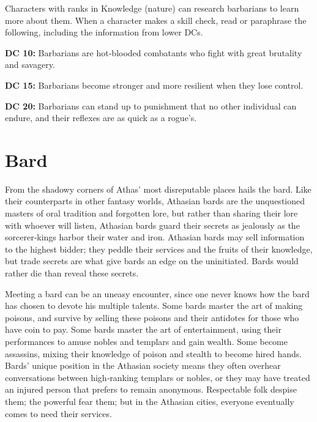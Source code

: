 \documentclass[10pt,a4paper,twocolumn]{d20}
\begin{document}
{Characters with ranks in Knowledge (nature) can research barbarians to learn more about them. When a character makes a skill check, read or paraphrase the following, including the information from lower DCs.

\textbf{DC 10:} Barbarians are hot‐blooded combatants who fight with great brutality and savagery.

\textbf{DC 15:} Barbarians become stronger and more resilient when they lose control.

\textbf{DC 20:} Barbarians can stand up to punishment that no other individual can endure, and their reflexes are as quick as a rogue’s.

\section{Bard}

From the shadowy corners of Athas’ most disreputable places hails the bard. Like their counterparts in other fantasy worlds, Athasian bards are the unquestioned masters of oral tradition and forgotten lore, but rather than sharing their lore with whoever will listen, Athasian bards guard their secrets as jealously as the sorcerer‐kings harbor their water and iron. Athasian bards may sell information to the highest bidder; they peddle their services and the fruits of their knowledge, but trade secrets are what give bards an edge on the uninitiated. Bards would rather die than reveal these secrets.

Meeting a bard can be an uneasy encounter, since one never knows how the bard has chosen to devote his multiple talents. Some bards master the art of making poisons, and survive by selling these poisons and their antidotes for those who have coin to pay. Some bards master the art of entertainment, using their performances to amuse nobles and templars and gain wealth. Some become assassins, mixing their knowledge of poison and stealth to become hired hands. Bards’ unique position in the Athasian society means they often overhear conversations between high‐ranking templars or nobles, or they may have treated an injured person that prefers to remain anonymous. Respectable folk despise them; the powerful fear them; but in the Athasian cities, everyone eventually comes to need their services.

}
\end{document}
